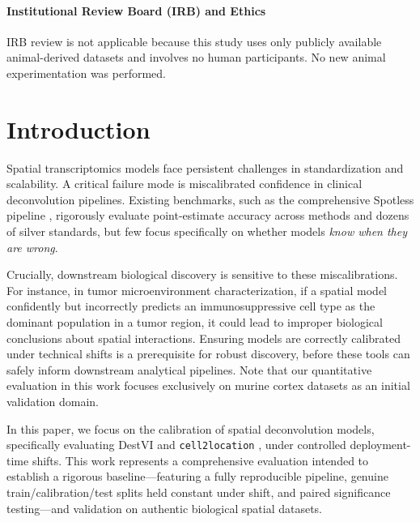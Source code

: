 \documentclass{jmlr} %
\begin{document}
\paragraph*{Institutional Review Board (IRB) and Ethics}
IRB review is not applicable because this study uses only publicly available animal-derived datasets and involves no human participants. No new animal experimentation was performed.

\section{Introduction}
\label{sec:intro}
Spatial transcriptomics models face persistent challenges in standardization and scalability. A critical failure mode is miscalibrated confidence in clinical deconvolution pipelines. Existing benchmarks, such as the comprehensive Spotless pipeline \citep{sang2024spotless}, rigorously evaluate point-estimate accuracy across methods and dozens of silver standards, but few focus specifically on whether models \textit{know when they are wrong}. 

Crucially, downstream biological discovery is sensitive to these miscalibrations. For instance, in tumor microenvironment characterization, if a spatial model confidently but incorrectly predicts an immunosuppressive cell type as the dominant population in a tumor region, it could lead to improper biological conclusions about spatial interactions. Ensuring models are correctly calibrated under technical shifts is a prerequisite for robust discovery, before these tools can safely inform downstream analytical pipelines. Note that our quantitative evaluation in this work focuses exclusively on murine cortex datasets as an initial validation domain.

In this paper, we focus on the calibration of spatial deconvolution models, specifically evaluating DestVI \citep{lopez2022destvi} and \texttt{cell2location} \citep{kleshchevnikov2022cell2location}, under controlled deployment-time shifts. This work represents a comprehensive evaluation intended to establish a rigorous baseline---featuring a fully reproducible pipeline, genuine train/calibration/test splits held constant under shift, and paired significance testing---and validation on authentic biological spatial datasets.
\end{document}

